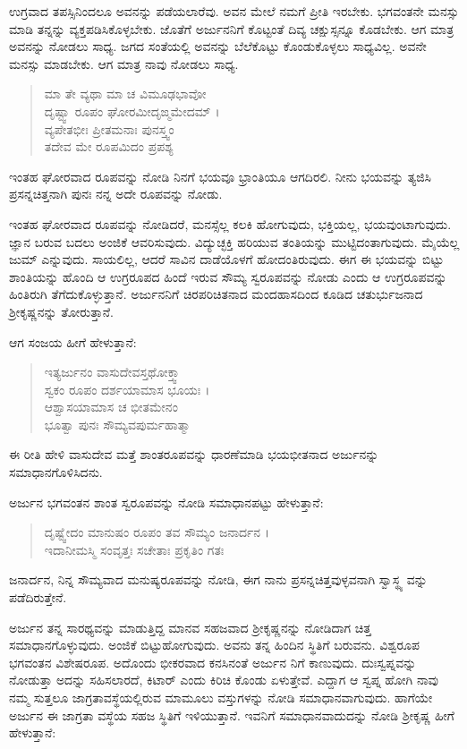 ಉಗ್ರವಾದ ತಪಸ್ಸಿನಿಂದಲೂ ಅವನನ್ನು ಪಡೆಯಲಾರೆವು. ಅವನ ಮೇಲೆ ನಮಗೆ ಪ್ರೀತಿ ಇರಬೇಕು. ಭಗವಂತನೇ ಮನಸ್ಸು ಮಾಡಿ ತನ್ನನ್ನು ವ್ಯಕ್ತಪಡಿಸಿಕೊಳ್ಳಬೇಕು. ಜೊತೆಗೆ ಅರ್ಜುನನಿಗೆ ಕೊಟ್ಟಂತೆ ದಿವ್ಯ ಚಕ್ಷುಸ್ಸನ್ನೂ ಕೊಡಬೇಕು. ಆಗ ಮಾತ್ರ ಅವನನ್ನು ನೋಡಲು ಸಾಧ್ಯ. ಜಗದ ಸಂತೆಯಲ್ಲಿ ಅವನನ್ನು ಬೆಲೆಕೊಟ್ಟು ಕೊಂಡುಕೊಳ್ಳಲು ಸಾಧ್ಯವಿಲ್ಲ. ಅವನೇ ಮನಸ್ಸು ಮಾಡಬೇಕು. ಆಗ ಮಾತ್ರ ನಾವು ನೋಡಲು ಸಾಧ್ಯ.

\begin{verse}
ಮಾ ತೇ ವ್ಯಥಾ ಮಾ ಚ ವಿಮೂಢಭಾವೋ \\ ದೃಷ್ಟ್ವಾ ರೂಪಂ ಘೋರಮೀದೃಙ್ಮಮೇದಮ್ ।\\ವ್ಯಪೇತಭೀಃ ಪ್ರೀತಮನಾಃ ಪುನಸ್ತ್ವಂ \\ ತದೇವ ಮೇ ರೂಪಮಿದಂ ಪ್ರಪಶ್ಯ 
\end{verse}

{\small ಇಂತಹ ಘೋರವಾದ ರೂಪವನ್ನು ನೋಡಿ ನಿನಗೆ ಭಯವೂ ಭ್ರಾಂತಿಯೂ ಆಗದಿರಲಿ. ನೀನು ಭಯವನ್ನು ತ್ಯಜಿಸಿ ಪ್ರಸನ್ನಚಿತ್ತನಾಗಿ ಪುನಃ ನನ್ನ ಅದೇ ರೂಪವನ್ನು ನೋಡು.}

ಇಂತಹ ಘೋರವಾದ ರೂಪವನ್ನು ನೋಡಿದರೆ, ಮನಸ್ಸೆಲ್ಲ ಕಲಕಿ ಹೋಗುವುದು, ಭಕ್ತಿಯಲ್ಲ, ಭಯವುಂಟಾಗುವುದು. ಜ್ಞಾನ ಬರುವ ಬದಲು ಅಂಜಿಕೆ ಆವರಿಸುವುದು. ವಿದ್ಯುಚ್ಛಕ್ತಿ ಹರಿಯುವ ತಂತಿಯನ್ನು ಮುಟ್ಟಿದಂತಾಗುವುದು. ಮೈಯೆಲ್ಲ ಜುಮ್ ಎನ್ನುವುದು. ಸಾಯಲಿಲ್ಲ, ಆದರೆ ಸಾವಿನ ದಾಡೆಯೊಳಗೆ ಹೋದಂತಿರುವುದು. ಈಗ ಈ ಭಯವನ್ನು ಬಿಟ್ಟು ಶಾಂತಿಯನ್ನು ಹೊಂದಿ ಆ ಉಗ್ರರೂಪದ ಹಿಂದೆ ಇರುವ ಸೌಮ್ಯ ಸ್ವರೂಪವನ್ನು ನೋಡು ಎಂದು ಆ ಉಗ್ರರೂಪವನ್ನು ಹಿಂತಿರುಗಿ ತೆಗೆದುಕೊಳ್ಳುತ್ತಾನೆ. ಅರ್ಜುನನಿಗೆ ಚಿರಪರಿಚಿತನಾದ ಮಂದಹಾಸದಿಂದ ಕೂಡಿದ ಚತುರ್ಭುಜನಾದ ಶ್ರೀಕೃಷ್ಣನನ್ನು ತೋರುತ್ತಾನೆ.

ಆಗ ಸಂಜಯ ಹೀಗೆ ಹೇಳುತ್ತಾನೆ:

\begin{verse}
ಇತ್ಯರ್ಜುನಂ ವಾಸುದೇವಸ್ತಥೋಕ್ತ್ವಾ \\ ಸ್ವಕಂ ರೂಪಂ ದರ್ಶಯಾಮಾಸ ಭೂಯಃ ।\\ಆಶ್ವಾಸಯಾಮಾಸ ಚ ಭೀತಮೇನಂ \\ ಭೂತ್ವಾ ಪುನಃ ಸೌಮ್ಯವಪುರ್ಮಹಾತ್ಮಾ 
\end{verse}

{\small ಈ ರೀತಿ ಹೇಳಿ ವಾಸುದೇವ ಮತ್ತೆ ಶಾಂತರೂಪವನ್ನು ಧಾರಣೆಮಾಡಿ ಭಯಭೀತನಾದ ಅರ್ಜುನನ್ನು ಸಮಾಧಾನಗೊಳಿಸಿದನು.}

ಅರ್ಜುನ ಭಗವಂತನ ಶಾಂತ ಸ್ವರೂಪವನ್ನು ನೋಡಿ ಸಮಾಧಾನಪಟ್ಟು ಹೇಳುತ್ತಾನೆ:

\begin{verse}
ದೃಷ್ಟ್ವೇದಂ ಮಾನುಷಂ ರೂಪಂ ತವ ಸೌಮ್ಯಂ ಜನಾರ್ದನ ।\\ಇದಾನೀಮಸ್ಮಿ ಸಂವೃತ್ತಃ ಸಚೇತಾಃ ಪ್ರಕೃತಿಂ ಗತಃ 
\end{verse}

{\small ಜನಾರ್ದನ, ನಿನ್ನ ಸೌಮ್ಯವಾದ ಮನುಷ್ಯರೂಪವನ್ನು ನೋಡಿ, ಈಗ ನಾನು ಪ್ರಸನ್ನಚಿತ್ತವುಳ್ಳವನಾಗಿ ಸ್ವಾಸ್ಥ್ಯ ವನ್ನು ಪಡೆದಿರುತ್ತೇನೆ.}

ಅರ್ಜುನ ತನ್ನ ಸಾರಥ್ಯವನ್ನು ಮಾಡುತ್ತಿದ್ದ ಮಾನವ ಸಹಜವಾದ ಶ್ರೀಕೃಷ್ಣನನ್ನು ನೋಡಿದಾಗ ಚಿತ್ತ ಸಮಾಧಾನಗೊಳ್ಳುವುದು. ಅಂಜಿಕೆ ಬಿಟ್ಟುಹೋಗುವುದು. ಅವನು ತನ್ನ ಹಿಂದಿನ ಸ್ಥಿತಿಗೆ ಬರುವನು. ವಿಶ್ವರೂಪ ಭಗವಂತನ ವಿಶೇಷರೂಪ. ಅದೊಂದು ಭೀಕರವಾದ ಕನಸಿನಂತೆ ಅರ್ಜುನ ನಿಗೆ ಕಾಣುವುದು. ದುಃಸ್ವಪ್ನವನ್ನು ನೋಡುತ್ತಾ ಅದನ್ನು ಸಹಿಸಲಾರದೆ, ಕಿಟಾರ್ ಎಂದು ಕಿರಿಚಿ ಕೊಂಡು ಏಳುತ್ತೇವೆ. ಎದ್ದಾಗ ಆ ಸ್ವಪ್ನ ಹೋಗಿ ನಾವು ನಮ್ಮ ಸುತ್ತಲೂ ಜಾಗ್ರತಾವಸ್ಥೆಯಲ್ಲಿರುವ ಮಾಮೂಲು ವಸ್ತುಗಳನ್ನು ನೋಡಿ ಸಮಾಧಾನವಾಗುವುದು. ಹಾಗೆಯೇ ಅರ್ಜುನ ಈ ಜಾಗ್ರತಾ ವಸ್ಥೆಯ ಸಹಜ ಸ್ಥಿತಿಗೆ ಇಳಿಯುತ್ತಾನೆ. ಇವನಿಗೆ ಸಮಾಧಾನವಾದುದನ್ನು ನೋಡಿ ಶ್ರೀಕೃಷ್ಣ ಹೀಗೆ ಹೇಳುತ್ತಾನೆ:

